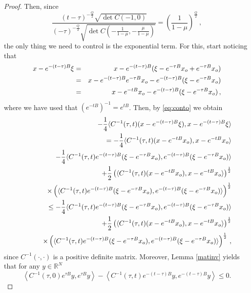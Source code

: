 \documentclass[10pt,a4paper]{amsart}
\def \r{{\mathbb{R}}}
\begin{document}
\begin{proof}
Then, since 
\[
\frac{(t-\tau)^{-\frac{Q}{2}}\sqrt{\det C(-1,0)}}{(-\tau)^{-\frac{Q}{2}}\sqrt{\det C(-\frac{1}{1-\mu},-\frac{\mu}{1-\mu})}} = \left(\frac{1}{1-\mu}\right)^{\frac{Q}{2}}\,,
\] 
the only thing we need to control is the exponential term. For this, start noticing that
\begin{eqnarray}\label{eq:conto}
    x-e^{-(t-\tau)B}\xi & = & x - e^{-(t-\tau)B}(\xi -e^{-\tau B}x_{\rm o}+ e^{-\tau B}x_{\rm o})\notag\\
    & = & x - e^{-(t-\tau)B}e^{-\tau B}x_{\rm o} - e^{-(t-\tau)B}(\xi -e^{-\tau B}x_{\rm o})\notag\\
    & = &  x - e^{-tB}x_{\rm o}- e^{-(t-\tau)B}(\xi -e^{-\tau B}x_{\rm o})\,,
\end{eqnarray}
where we have used that $(e^{-tB})^{-1}=e^{t B}$. Then, by  \eqref{eq:conto} we obtain
\begin{eqnarray}\label{exponent}
&&-\frac{1}{4}\langle C^{-1}(\tau,t)(x-e^{-(t-\tau)B}\xi),x-e^{-(t-\tau)B}\xi\rangle\notag\\
&& \quad = -\frac{1}{4}\langle C^{-1}(\tau,t)(x-e^{-tB}x_{\rm o}),x-e^{-tB}x_{\rm o}\rangle\notag\\
&& \qquad -\frac{1}{4}\langle C^{-1}(\tau,t)e^{-(t-\tau)B}(\xi -e^{-\tau B}x_{\rm o}),e^{-(t-\tau)B}(\xi -e^{-\tau B}x_{\rm o})\rangle\nonumber\\
&& \qquad + \frac{1}{2}\left(\langle C^{-1}(\tau,t)(x-e^{-tB}x_{\rm o}),x-e^{-tB}x_{\rm o}\rangle\right)^\frac{1}{2}\notag\\
&& \qquad \times \left( \langle C^{-1}(\tau,t)e^{-(t-\tau)B}(\xi -e^{-\tau B}x_{\rm o}),e^{-(t-\tau)B}(\xi -e^{-\tau B}x_{\rm o})\rangle\right)^\frac{1}{2}\notag\\ 
&& \quad \leq -\frac{1}{4}\langle C^{-1}(\tau,t)e^{-(t-\tau)B}(\xi -e^{-\tau B}x_{\rm o}),e^{-(t-\tau)B}(\xi -e^{-\tau B}x_{\rm o})\rangle\\
&& \qquad + \frac{1}{2}\left(\langle C^{-1}(\tau,t)(x-e^{-tB}x_{\rm o}),x-e^{-tB}x_{\rm o}\rangle\right)^\frac{1}{2}\notag\\
&& \qquad \times \left( \langle C^{-1}(\tau,t)e^{-(t-\tau)B}(\xi -e^{-\tau B}x_{\rm o}),e^{-(t-\tau)B}(\xi -e^{-\tau B}x_{\rm o})\rangle\right)^\frac{1}{2} \,, \notag
\end{eqnarray}
since $C^{-1}(\cdot,\cdot)$ is a positive definite matrix.  Moreover, Lemma \ref{matinv} yields that for any $y \in \r^N$
 $$
 \left\langle C^{-1}(\tau,0)e^{\tau B}y,e^{\tau B}y\right\rangle-\left\langle C^{-1}(\tau,t) e^{-(t-\tau)B}y,e^{-(t-\tau)B}y\right\rangle\leq 0.
$$
\end{proof}
\end{document}
